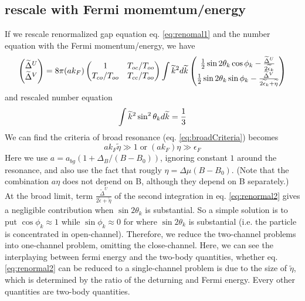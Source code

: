 \subsection{rescale with Fermi momemtum/energy}
If we rescale renormalized gap equation eq. \ref{eq:renomal1} and the number equation with the Fermi momentum/energy, we have 
\begin{equation}\label{eq:renormal2}
\begin{pmatrix}\widetilde\Delta^U\\\widetilde\Delta^V\end{pmatrix}=
8\pi({a}{k_F})\begin{pmatrix}1&T_{oc}/T_{oo}\\T_{co}/T_{oo}&T_{cc}/T_{oo}\end{pmatrix}
\int\widetilde{k}^2d\widetilde{k}
\begin{pmatrix}
\frac{1}{2}\sin2\theta_{k}\cos\phi_k-\frac{\widetilde\Delta^U}{2\widetilde\epsilon_k}\\
\frac{1}{2}\sin2\theta_{k}\sin\phi_k-\frac{\widetilde\Delta^V}{2\widetilde\epsilon_k+\widetilde{\eta}}
\end{pmatrix}
\end{equation}
and rescaled number equation
\begin{equation}
 \int\widetilde{k}^2\sin^2\theta_kd\widetilde{k}=\frac{1}{3}
\end{equation}
We can find the criteria of broad resonance (eq. \ref{eq:broadCriteria}) becomes 
\begin{equation}
 ak_F\widetilde{\eta}\gg1 \;\text{or}\; (ak_F)\eta\gg\epsilon_F
\end{equation}
Here we use $a=a_{bg}(1+\Delta_B/(B-B_0))$,  ignoring constant $1$ around the resonance, and also use the fact that rougly $\eta=\Delta\mu(B-B_0)$. (Note that the combination $a\eta$ does not depend on B, although they depend on B separately.)   At the broad limit, term $\frac{\widetilde\Delta^U}{2\widetilde\epsilon+\widetilde{\eta}}$ of the second integration in eq. \ref{eq:renormal2} gives a negligible contribution when $\sin2\theta_k$ is substantial.  So a simple solution is to put $\cos\phi_k\approx1$ while $\sin\phi_k\approx0$ for where $\sin2\theta_k$ is substantial (i.e. the particle is concentrated in open-channel).  Therefore, we reduce the two-channel problems into one-channel problem, omitting the close-channel. Here, we can see the interplaying between fermi energy and the two-body quantities, whether eq. \ref{eq:renormal2} can be reduced to a single-channel problem is due to the size of $\widetilde{\eta}$, which is determined by the ratio of the deturning and Fermi energy.  Every other quantities are two-body quantities. 

